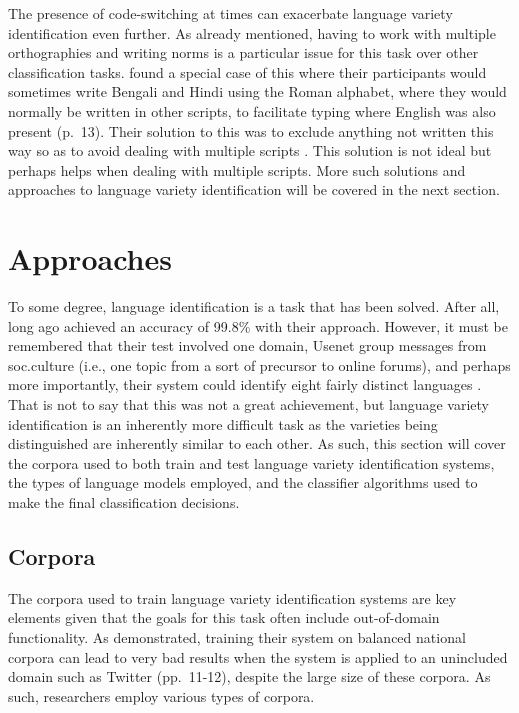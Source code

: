 \documentclass{article}
\begin{document}
      The presence of code-switching at times can exacerbate language variety identification even further.
      As already mentioned, having to work with multiple orthographies and writing norms is a particular issue for this task over other classification tasks.
      \textcite{barman_code_2014} found a special case of this where their participants would sometimes write Bengali and Hindi using the Roman alphabet, where they would normally be written in other scripts, to facilitate typing where English was also present (p.~13).
      Their solution to this was to exclude anything not written this way so as to avoid dealing with multiple scripts \parencite[p.~15]{barman_code_2014}.
      This solution is not ideal but perhaps helps when dealing with multiple scripts.
      More such solutions and approaches to language variety identification will be covered in the next section.


  \section{Approaches}
    To some degree, language identification is a task that has been solved.
    After all, \textcite{cavnar_n-gram-based_1994} long ago achieved an accuracy of 99.8\% with their approach.
    However, it must be remembered that their test involved one domain, Usenet group messages from soc.culture (i.e., one topic from a sort of precursor to online forums), and perhaps more importantly, their system could identify eight fairly distinct languages \parencite[pp.~6-7]{cavnar_n-gram-based_1994}.
    That is not to say that this was not a great achievement, but language variety identification is an inherently more difficult task as the varieties being distinguished are inherently similar to each other.
    As such, this section will cover the corpora used to both train and test language variety identification systems, the types of language models employed, and the classifier algorithms used to make the final classification decisions.

    \subsection{Corpora}
      The corpora used to train language variety identification systems are key elements given that the goals for this task often include out-of-domain functionality.
      As \textcite{lui_classifying_2013} demonstrated, training their system on balanced national corpora can lead to very bad results when the system is applied to an unincluded domain such as Twitter (pp.~11-12), despite the large size of these corpora.
      As such, researchers employ various types of corpora.
\end{document}
